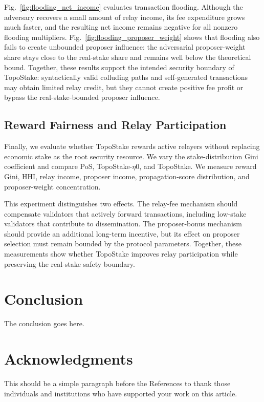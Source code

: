 \documentclass[lettersize,journal]{IEEEtran}
\begin{document}
Fig.~\ref{fig:flooding_net_income} evaluates transaction flooding.
Although the adversary recovers a small amount of relay income, its fee expenditure grows much faster, and the resulting net income remains negative for all nonzero flooding multipliers.
Fig.~\ref{fig:flooding_proposer_weight} shows that flooding also fails to create unbounded proposer influence: the adversarial proposer-weight share stays close to the real-stake share and remains well below the theoretical bound.
Together, these results support the intended security boundary of TopoStake: syntactically valid colluding paths and self-generated transactions may obtain limited relay credit, but they cannot create positive fee profit or bypass the real-stake-bounded proposer influence.

\subsection{Reward Fairness and Relay Participation}
\label{subsec:eval_fairness}

Finally, we evaluate whether TopoStake rewards active relayers without replacing economic stake as the root security resource. We vary the stake-distribution Gini coefficient and compare PoS, TopoStake-$\eta0$, and TopoStake. We measure reward Gini, HHI, relay income, proposer income, propagation-score distribution, and proposer-weight concentration.

This experiment distinguishes two effects. The relay-fee mechanism should compensate validators that actively forward transactions, including low-stake validators that contribute to dissemination. The proposer-bonus mechanism should provide an additional long-term incentive, but its effect on proposer selection must remain bounded by the protocol parameters. Together, these measurements show whether TopoStake improves relay participation while preserving the real-stake safety boundary.

\section{Conclusion}
The conclusion goes here.


\section*{Acknowledgments}
This should be a simple paragraph before the References to thank those individuals and institutions who have supported your work on this article.










 
\end{document}
